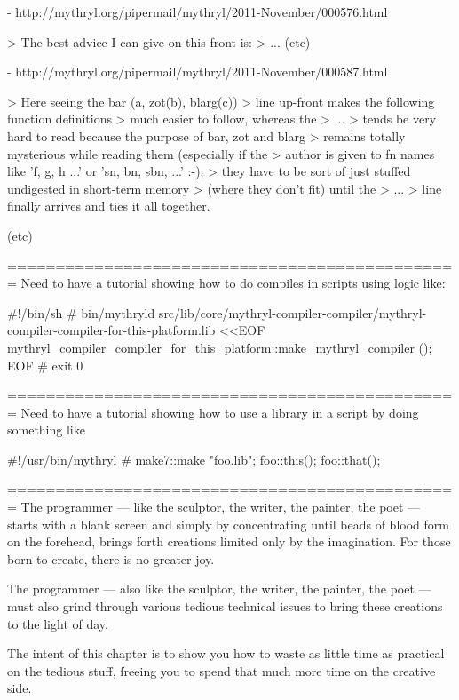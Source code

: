     - http://mythryl.org/pipermail/mythryl/2011-November/000576.html 

    > The best advice I can give on this front is: 
    > ... (etc) 

    - http://mythryl.org/pipermail/mythryl/2011-November/000587.html 

    > Here seeing the   bar (a, zot(b), blarg(c)) 
    > line up-front makes the following function definitions 
    > much easier to follow, whereas the 
    > ... 
    > tends be very hard to read because the purpose of bar, zot and blarg 
    > remains totally mysterious while reading them (especially if the 
    > author is given to fn names like 'f, g, h ...' or 'sn, bn, sbn, ...' :-); 
    > they have to be sort of just stuffed undigested in short-term memory 
    > (where they don't fit) until the 
    > ... 
    > line finally arrives and ties it all together. 

    (etc) 
 


=============================================== 
Need to have a tutorial showing how to do compiles 
in scripts using logic like:

    #!/bin/sh 
    # 
    bin/mythryld  src/lib/core/mythryl-compiler-compiler/mythryl-compiler-compiler-for-this-platform.lib  <<EOF 
        mythryl_compiler_compiler_for_this_platform::make_mythryl_compiler (); 
    EOF 
    # 
    exit 0 


=============================================== 
Need to have a tutorial showing how to use a library 
in a script by doing something like 

    #!/usr/bin/mythryl 
    # 
    make7::make "foo.lib"; 
    { 
        foo::this(); 
        foo::that(); 
    } 



=============================================== 
The programmer --- like the sculptor, the writer, the painter,
the poet --- starts with a blank screen and simply by concentrating 
until beads of blood form on the forehead, brings forth creations 
limited only by the imagination.  For those born to create, there 
is no greater joy.

The programmer --- also like the sculptor, the writer, the painter,
the poet --- must also grind through various tedious technical issues 
to bring these creations to the light of day.

The intent of this chapter is to show you how to waste as little time 
as practical on the tedious stuff, freeing you to spend that much more 
time on the creative side.

